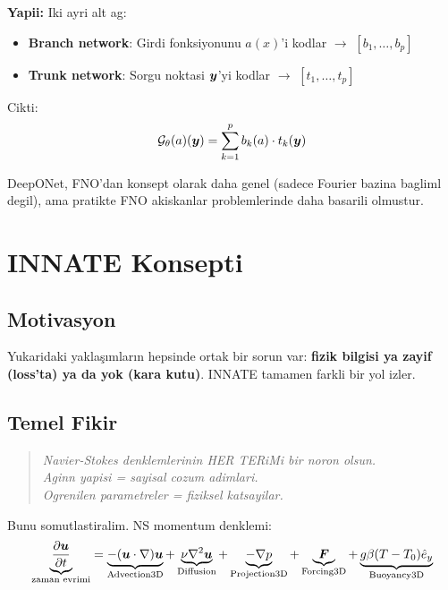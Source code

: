 \textbf{Yapii:} Iki ayri alt ag:
\begin{itemize}
\item \textbf{Branch network}: Girdi fonksiyonunu $a(x)$'i kodlar $\to$ $[b_1, \ldots, b_p]$
\item \textbf{Trunk network}: Sorgu noktasi $\bm{y}$'yi kodlar $\to$ $[t_1, \ldots, t_p]$
\end{itemize}

Cikti:
\begin{equation}
\mathcal{G}_\theta(a)(\bm{y}) = \sum_{k=1}^{p} b_k(a)\cdot t_k(\bm{y})
\label{eq:deeponet}
\end{equation}

\begin{remark}
DeepONet, FNO'dan konsept olarak daha genel (sadece Fourier bazina bagliml degil), ama pratikte FNO akiskanlar problemlerinde daha basarili olmustur.
\end{remark}


\section{INNATE Konsepti}
\label{sec:innate}

\subsection{Motivasyon}

Yukaridaki yaklaşımların hepsinde ortak bir sorun var: \textbf{fizik bilgisi ya zayif (loss'ta) ya da yok (kara kutu)}. INNATE tamamen farkli bir yol izler.

\subsection{Temel Fikir}

\begin{quote}
\textit{Navier-Stokes denklemlerinin HER TERiMi bir noron olsun.\\
Aginn yapisi = sayisal cozum adimlari.\\
Ogrenilen parametreler = fiziksel katsayilar.}
\end{quote}

Bunu somutlastiralim. NS momentum denklemi:
\begin{equation}
\underbrace{\frac{\partial \bm{u}}{\partial t}}_{\text{zaman evrimi}} = \underbrace{-(\bm{u}\cdot\nabla)\bm{u}}_{\text{Advection3D}} + \underbrace{\nu\nabla^2\bm{u}}_{\text{Diffusion}} + \underbrace{-\nabla p}_{\text{Projection3D}} + \underbrace{\bm{F}}_{\text{Forcing3D}} + \underbrace{g\beta(T-T_0)\hat{e}_y}_{\text{Buoyancy3D}}
\label{eq:innate_ns}
\end{equation}

